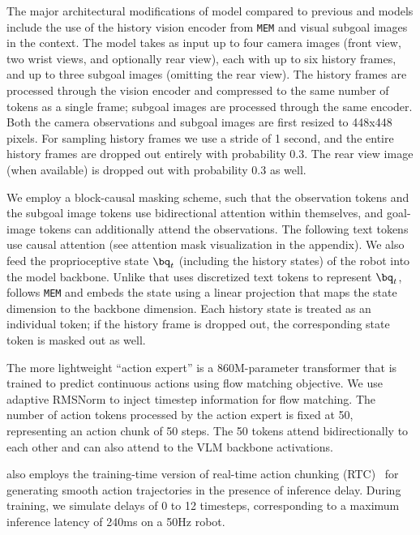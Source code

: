 
\label{subsec:architecture}

The major architectural modifications of \MethodName{} model compared to previous \Pizf{} and \Pizs{} models include the use of the history vision encoder from \texttt{MEM} \cite{torne2026mem} and visual subgoal images in the context.
The model takes as input up to four camera images (front view, two wrist views, and optionally rear view), each with up to six history frames, and up to three subgoal images (omitting the rear view). The history frames are processed through the vision encoder and compressed to the same number of tokens as a single frame; subgoal images are processed through the same encoder. Both the camera observations and subgoal images are first resized to 448x448 pixels.
For sampling history frames we use a stride of 1 second, 
and the entire history frames are dropped out entirely with probability 0.3. The rear view image (when available) is dropped out with probability 0.3 as well.

We employ a block-causal masking scheme, such that the observation tokens and the subgoal image tokens use bidirectional attention within themselves, and goal-image tokens can additionally attend the observations. The following text tokens use causal attention
(see attention mask visualization in the appendix). We also feed the proprioceptive state $\bq_t$ (including the history states) of the robot into the model backbone. Unlike \Pizs{} that uses discretized text tokens to represent $\bq_t$, \MethodName{} follows \texttt{MEM} and embeds the state using a linear projection that maps the state dimension to the backbone dimension. Each history state is treated as an individual token; if the history frame is dropped out, the corresponding state token is masked out as well.

The more lightweight ``action expert'' is a 860M-parameter transformer that is trained to predict continuous actions using flow matching objective. We use adaptive RMSNorm to inject timestep information for flow matching. The number of action tokens processed by the action expert is fixed at 50, representing an action chunk of 50 steps. The 50 tokens attend bidirectionally to each other and can also attend to the VLM backbone activations.

\MethodName{} also employs the training-time version of real-time action chunking (RTC)~\cite{black2025real,black2025ttrtc} for generating smooth action trajectories in the presence of inference delay. During training, we simulate delays of 0 to 12 timesteps, corresponding to a maximum inference latency of 240ms on a 50Hz robot.

